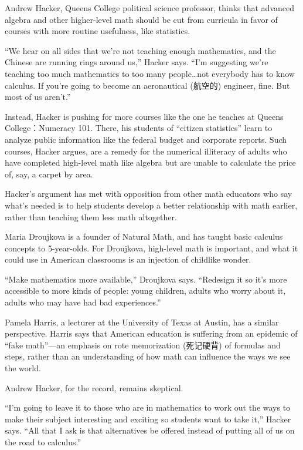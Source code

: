 \documentclass[UTF8,11pt]{ctexart}
\begin{document}
Andrew Hacker, Queens College political science professor, thinks that advanced algebra and other higher-level math should be cut from curricula in favor of courses with more routine usefulness, like statistics.


“We hear on all sides that we're not teaching enough mathematics, and the Chinese are running rings around us,” Hacker says. “I'm suggesting we're teaching too much mathematics to too many people…not everybody has to know calculus. If you're going to become an aeronautical (航空的) engineer, fine. But most of us aren't.”


Instead, Hacker is pushing for more courses like the one he teaches at Queens College：Numeracy 101. There, his students of “citizen statistics” learn to analyze public information like the federal budget and corporate reports. Such courses, Hacker argues, are a remedy for the numerical illiteracy of adults who have completed high-level math like algebra but are unable to calculate the price of, say, a carpet by area.


Hacker's argument has met with opposition from other math educators who say what's needed is to help students develop a better relationship with math earlier, rather than teaching them less math altogether.


Maria Droujkova is a founder of Natural Math, and has taught basic calculus concepts to 5-year-olds. For Droujkova, high-level math is important, and what it could use in American classrooms is an injection of childlike wonder.


“Make mathematics more available,” Droujkova says. “Redesign it so it's more accessible to more kinds of people: young children, adults who worry about it, adults who may have had bad experiences.”


Pamela Harris, a lecturer at the University of Texas at Austin, has a similar perspective. Harris says that American education is suffering from an epidemic of “fake math”—an emphasis on rote memorization (死记硬背) of formulas and steps, rather than an understanding of how math can influence the ways we see the world.


Andrew Hacker, for the record, remains skeptical.


“I'm going to leave it to those who are in mathematics to work out the ways to make their subject interesting and exciting so students want to take it,” Hacker says. “All that I ask is that alternatives be offered instead of putting all of us on the road to calculus.”
\end{document}

